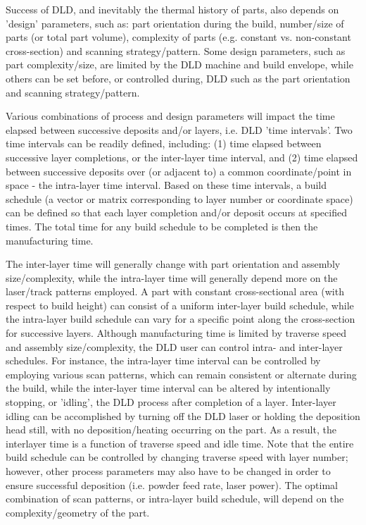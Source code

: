 \documentclass[10pt]{article}
\begin{document}
Success of DLD, and inevitably the thermal history of parts, also depends on 'design' parameters, such as: part orientation during the build, number/size of parts (or total part volume), complexity of parts (e.g. constant vs. non-constant cross-section) and scanning strategy/pattern. Some design parameters, such as part complexity/size, are limited by the DLD machine and build envelope, while others can be set before, or controlled during, DLD such as the part orientation and scanning strategy/pattern.

Various combinations of process and design parameters will impact the time elapsed between successive deposits and/or layers, i.e. DLD 'time intervals'. Two time intervals can be readily defined, including: (1) time elapsed between successive layer completions, or the inter-layer time interval, and (2) time elapsed between successive deposits over (or adjacent to) a common coordinate/point in space - the intra-layer time interval. Based on these time intervals, a build schedule (a vector or matrix corresponding to layer number or coordinate space) can be defined so that each layer completion and/or deposit occurs at specified times. The total time for any build schedule to be completed is then the manufacturing time.

The inter-layer time will generally change with part orientation and assembly size/complexity, while the intra-layer time will generally depend more on the laser/track patterns employed. A part with constant cross-sectional area (with respect to build height) can consist of a uniform inter-layer build schedule, while the intra-layer build schedule can vary for a specific point along the cross-section for successive layers. Although manufacturing time is limited by traverse speed and assembly size/complexity, the DLD user can control intra- and inter-layer schedules. For instance, the intra-layer time interval can be controlled by employing various scan patterns, which can remain consistent or alternate during the build, while the inter-layer time interval can be altered by intentionally stopping, or 'idling', the DLD process after completion of a layer. Inter-layer idling can be accomplished by turning off the DLD laser or holding the deposition head still, with no deposition/heating occurring on the part. As a result, the interlayer time is a function of traverse speed and idle time. Note that the entire build schedule can be controlled by changing traverse speed with layer number; however, other process parameters may also have to be changed in order to ensure successful deposition (i.e. powder feed rate, laser power). The optimal combination of scan patterns, or intra-layer build schedule, will depend on the complexity/geometry of the part.
\end{document}
